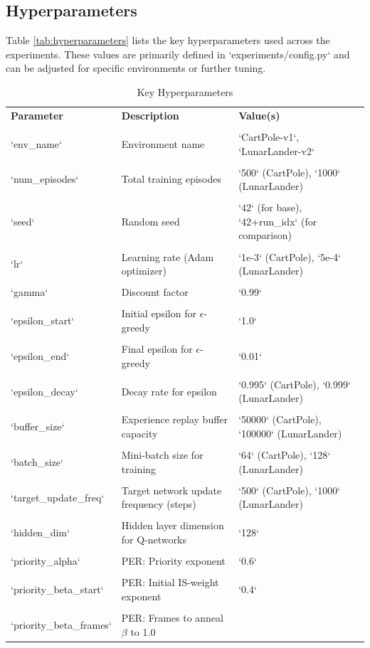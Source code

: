 \documentclass[conference]{IEEEtran}
\begin{document}
\subsection{Hyperparameters}

Table \ref{tab:hyperparameters} lists the key hyperparameters used across the experiments. These values are primarily defined in `experiments/config.py` and can be adjusted for specific environments or further tuning.

\begin{table}[ht]
\caption{Key Hyperparameters}
\centering
\begin{tabular}{|l|l|l|}
\hline
\textbf{Parameter} & \textbf{Description} & \textbf{Value(s)}\\\\
\hline
`env_name` & Environment name & `CartPole-v1`, `LunarLander-v2`\\\\\n`num_episodes` & Total training episodes & `500` (CartPole), `1000` (LunarLander)\\\\\n`seed` & Random seed & `42` (for base), `42+run_idx` (for comparison)\\\\\n`lr` & Learning rate (Adam optimizer) & `1e-3` (CartPole), `5e-4` (LunarLander)\\\\\n`gamma` & Discount factor & `0.99`\\\\\n`epsilon_start` & Initial epsilon for \(\epsilon\)-greedy & `1.0`\\\\\n`epsilon_end` & Final epsilon for \(\epsilon\)-greedy & `0.01`\\\\\n`epsilon_decay` & Decay rate for epsilon & `0.995` (CartPole), `0.999` (LunarLander)\\\\\n`buffer_size` & Experience replay buffer capacity & `50000` (CartPole), `100000` (LunarLander)\\\\\n`batch_size` & Mini-batch size for training & `64` (CartPole), `128` (LunarLander)\\\\\n`target_update_freq` & Target network update frequency (steps) & `500` (CartPole), `1000` (LunarLander)\\\\\n`hidden_dim` & Hidden layer dimension for Q-networks & `128`\\\\\n`priority_alpha` & PER: Priority exponent & `0.6`\\\\\n`priority_beta_start` & PER: Initial IS-weight exponent & `0.4`\\\\\n`priority_beta_frames` & PER: Frames to anneal \(\beta\) to 1.0 & 
\end{tabular}
\end{table}
\end{document}
